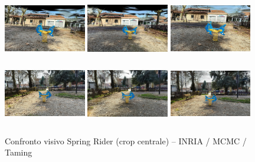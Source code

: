\begin{figure}[ht]
	\centering
	\includegraphics[width=0.32\textwidth,height=2.8cm,trim={80 40 80 40},clip]{images/benchmarks/spring_rider_inria_balanced_1.jpg}
	\includegraphics[width=0.32\textwidth,height=2.8cm,trim={80 40 80 40},clip]{images/benchmarks/spring_rider_mcmc_balanced_1.jpg}
	\includegraphics[width=0.32\textwidth,height=2.8cm,trim={80 40 80 40},clip]{images/benchmarks/spring_rider_taming_balanced_1.jpg}
	\includegraphics[width=0.32\textwidth,height=2.8cm,trim={80 40 80 40},clip]{images/benchmarks/spring_rider_inria_balanced_2.jpg}
	\includegraphics[width=0.32\textwidth,height=2.8cm,trim={80 40 80 40},clip]{images/benchmarks/spring_rider_mcmc_balanced_2.jpg}
	\includegraphics[width=0.32\textwidth,height=2.8cm,trim={80 40 80 40},clip]{images/benchmarks/spring_rider_taming_balanced_2.jpg}
	\caption{Confronto visivo Spring Rider (crop centrale) -- INRIA / MCMC / Taming}
	\label{fig:spring_rider_comparison}
\end{figure}


